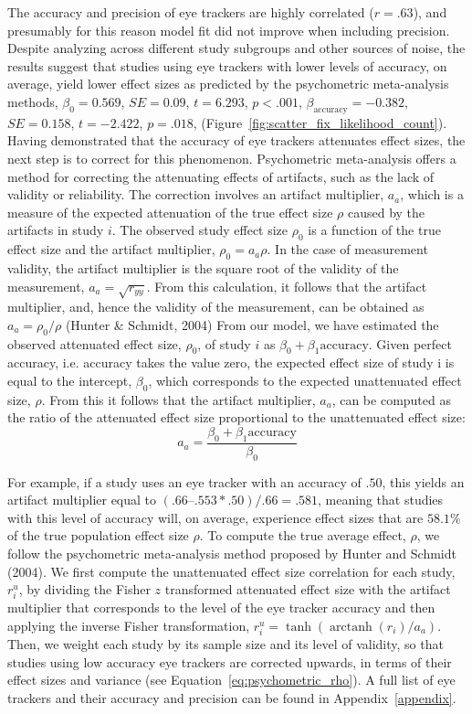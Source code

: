 \documentclass{article}
\newcommand{\SE}{\mathit{SE}}
\DeclareMathOperator\arctanh{arctanh}
\begin{document}
The accuracy and precision of eye trackers are highly correlated ($r = .63$), and presumably for this reason model fit did not improve when including precision. Despite analyzing across different study subgroups and other sources of noise, the results suggest that studies using eye trackers with lower levels of accuracy, on average, yield lower effect sizes as predicted by the psychometric meta-analysis methods, $\beta_0 = 0.569$, $\SE = 0.09$, $t = 6.293$, $p < .001$, $\beta_{\textrm{accuracy}} = -0.382$, $\SE = 0.158$, $t = -2.422$, $p = .018$, (Figure~\ref{fig:scatter_fix_likelihood_count}). Having demonstrated that the accuracy of eye trackers attenuates effect sizes, the next step is to correct for this phenomenon. Psychometric meta-analysis offers a method for correcting the attenuating effects of artifacts, such as the lack of validity or reliability. The correction involves an artifact multiplier, $a_a$, which is a measure of the expected attenuation of the true effect size $\rho$ caused by the artifacts in study $i$. The observed study effect size $\rho_0$ is a function of the true effect size and the artifact multiplier, $\rho_0 = a_a \rho$. In the case of measurement validity, the artifact multiplier is the square root of the validity of the measurement, $a_a = \sqrt{r_{yy}}$. From this calculation, it follows that the artifact multiplier, and, hence the validity of the measurement, can be obtained as $a_a = \rho_0 / \rho$ (Hunter \& Schmidt, 2004) From our model, we have estimated the observed attenuated effect size, $\rho_0$, of study $i$ as $\beta_0 + \beta_1 \textrm{accuracy}$. Given perfect accuracy, i.e. accuracy takes the value zero, the expected effect size of study i is equal to the intercept, $\beta_0$, which corresponds to the expected unattenuated effect size, $\rho$. From this it follows that the artifact multiplier, $a_a$, can be computed as the ratio of the attenuated effect size proportional to the unattenuated effect size:
%
\begin{equation}
\label{eq:artifact_multiplier}
a_a = \frac{\beta_0 + \beta_1 \textrm{accuracy}}{\beta_0}
\end{equation}

For example, if a study uses an eye tracker with an accuracy of $.50$, this yields an artifact multiplier equal to $(.66 – .553*.50)/.66 = .581$, meaning that studies with this level of accuracy will, on average, experience effect sizes that are $58.1\%$ of the true population effect size $\rho$. To compute the true average effect, $\rho$, we follow the psychometric meta-analysis method proposed by Hunter and Schmidt (2004). We first compute the unattenuated effect size correlation for each study, $r_i^u$, by dividing the Fisher $z$ transformed attenuated effect size with the artifact multiplier that corresponds to the level of the eye tracker accuracy and then applying the inverse Fisher transformation, $r_i^u = \tanh(\arctanh(r_i)/a_a)$. Then, we weight each study by its sample size and its level of validity, so that studies using low accuracy eye trackers are corrected upwards, in terms of their effect sizes and variance (see Equation~\ref{eq:psychometric_rho}). A full list of eye trackers and their accuracy and precision can be found in Appendix~\ref{appendix}.
\end{document}
